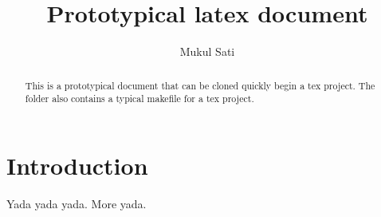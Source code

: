 \documentclass{article}
\title{Prototypical latex document}
\author{Mukul Sati}
\begin{document}
\begin{abstract}
This is a prototypical document that can be cloned quickly begin a tex project.
The folder also contains a typical makefile for a tex project.


\end{abstract}

\section{Introduction}
Yada yada yada. More yada.


\end{document}
